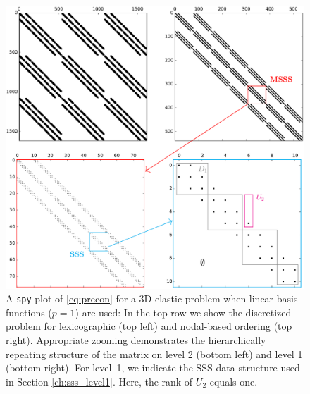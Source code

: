 \begin{figure}[H]
\centering
  \includegraphics[width=\columnwidth]{3d_hier_matrix.pdf}
\caption{A \texttt{spy} plot of \eqref{eq:precon} for a 3D elastic problem when linear basis functions ($p=1$) are used: In the top row we show the discretized problem for lexicographic (top left) and nodal-based ordering (top right). Appropriate zooming demonstrates the hierarchically repeating structure of the matrix on level 2 (bottom left) and level 1 (bottom right). For level~1, we indicate the SSS data structure used in Section \ref{ch:sss_level1}. Here, the rank of $U_2$ equals one.}
\label{fig:hier_struc}
\end{figure}
